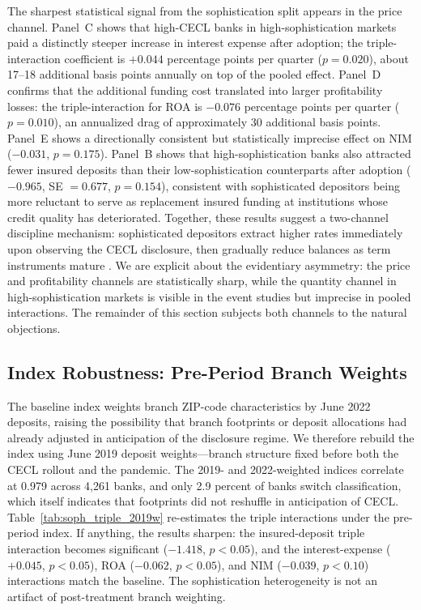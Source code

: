 The sharpest statistical signal from the sophistication split appears in the price
channel.  Panel~C shows that high-CECL banks in high-sophistication markets paid
a distinctly steeper increase in interest expense after adoption; the
triple-interaction coefficient is $+0.044$ percentage points per quarter
($p = 0.020$), about 17--18 additional basis points annually on top of the
pooled effect.  Panel~D confirms that the additional funding cost translated into
larger profitability losses: the triple-interaction for ROA is $-0.076$ percentage
points per quarter ($p = 0.010$), an annualized drag of approximately 30
additional basis points.  Panel~E shows a directionally consistent but
statistically imprecise effect on NIM ($-0.031$, $p = 0.175$).  Panel~B shows
that high-sophistication banks also attracted fewer insured deposits than their
low-sophistication counterparts after adoption ($-0.965$, SE $= 0.677$,
$p = 0.154$), consistent with sophisticated depositors being more reluctant to
serve as replacement insured funding at institutions whose credit quality has
deteriorated.  Together, these results suggest a two-channel discipline
mechanism: sophisticated depositors extract higher rates immediately upon
observing the CECL disclosure, then gradually reduce balances as term instruments
mature \citep{egan2017deposit}.  We are explicit about the evidentiary
asymmetry: the price and profitability channels are statistically sharp, while
the quantity channel in high-sophistication markets is visible in the event
studies but imprecise in pooled interactions.  The remainder of this section
subjects both channels to the natural objections.

\subsection{Index Robustness: Pre-Period Branch Weights}
\label{sec:heterogeneity:index}

The baseline index weights branch ZIP-code characteristics by June 2022
deposits, raising the possibility that branch footprints or deposit
allocations had already adjusted in anticipation of the disclosure regime.
We therefore rebuild the index using June 2019 deposit weights---branch
structure fixed before both the CECL rollout and the pandemic.  The 2019- and
2022-weighted indices correlate at 0.979 across 4,261 banks, and only 2.9
percent of banks switch classification, which itself indicates that
footprints did not reshuffle in anticipation of CECL.
Table~\ref{tab:soph_triple_2019w} re-estimates the triple interactions under
the pre-period index.  If anything, the results sharpen: the insured-deposit
triple interaction becomes significant ($-1.418$, $p < 0.05$), and the
interest-expense ($+0.045$, $p < 0.05$), ROA ($-0.062$, $p < 0.05$), and NIM
($-0.039$, $p < 0.10$) interactions match the baseline.  The sophistication
heterogeneity is not an artifact of post-treatment branch weighting.

